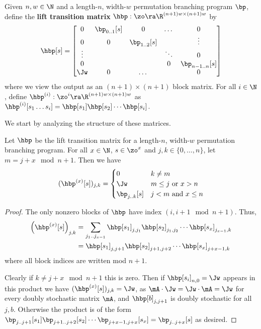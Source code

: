 \documentclass{toc}
\begin{document}
\begin{definition}\label{def:hbp}
Given $n,w\in \N$ and a length-$n$, width-$w$ permutation branching program $\bp$, define the \textbf{lift transition matrix} $\hbp:\zo\ra \R^{(n+1)w\times(n+1)w}$ by
\[\hbp[s] = \begin{bmatrix}
0 & \bp_{0..1}[s] & 0 & \dots & 0\\
0 & 0 & \bp_{1..2}[s] &  & \vdots\\
\vdots & &  & \ddots & 0\\
0 & ~ &   & 0 & \bp_{n-1..n}[s]\\
\Jw & 0 & \dots & & 0\\
\end{bmatrix}\]
where we view the output as an $(n+1)\times(n+1)$ block matrix. For all $i\in\N$, define $\hbp^{(i)}:\zo^{i}\ra \R^{(n+1)w\times(n+1)w}$ as $\hbp^{(i)}[s_1\dots s_i]=\hbp[s_1]\hbp[s_2]\cdots\hbp[s_{i}]$.
\end{definition}

We start by analyzing the structure of these matrices.
\begin{proposition}\label{prop:HBPstruct}
Let $\hbp$ be the lift transition matrix for a length-$n$, width-$w$ permutation branching program. %
For  %
all $x \in \N$, $s \in \zo^x$ and $j,k\in \{0,\ldots,n\}$, let $m=j+x\mod n+1$. 
%
Then we have  %
\[(\hbp^{(x)}[s])_{j,k} = \begin{cases}
0 & k\neq m\\
\Jw & m \leq j \text{ or } x>n\\
\bp_{j..k}[s] & j < m \text{ and } x\leq n
\end{cases}\]
\end{proposition}
\begin{proof}
The only nonzero blocks of $\hbp$ have index $(i,i+1 \mod n+1)$. Thus, 
\begin{align*}
    \left(\hbp^{(x)}[s]\right)_{j,k} &= \sum_{j_1..j_{x-1}}\hbp[s_1]_{j,j_1}\hbp[s_2]_{j_1,j_2}\cdots \hbp[s_x]_{j_{x-1},k}\\
    &= \hbp[s_1]_{j,j+1}\hbp[s_2]_{j+1,j+2}\cdots \hbp[s_x]_{j+x-1,k} %
\end{align*}
%
where %
all block indices are written mod $n+1$.

Clearly if $k\neq j+x\mod n+1$ this is zero. Then if $\hbp[s_i]_{n,0}=\Jw$ appears in this product we have $(\hbp^{(x)}[s])_{j,k}=\Jw$, as $\mA\cdot\Jw=\Jw\cdot\mA=\Jw$ for every doubly stochastic matrix $\mA$, and $\hbp[b]_{j,j+1}$ is doubly stochastic for all $j,b$. Otherwise the product is of the form $\bp_{j..j+1}[s_1]\bp_{j+1..j+2}[s_2]\cdots \bp_{j+x-1,j+x}[s_x]=\bp_{j..j+x}[s]$ as desired.
\end{proof}
\end{document}
